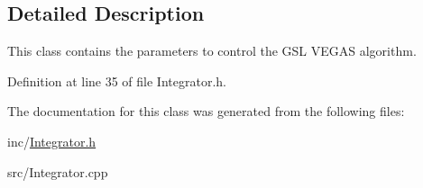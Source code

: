 \subsection{Detailed Description}
This class contains the parameters to control the G\+S\+L V\+E\+G\+A\+S algorithm. 

Definition at line 35 of file Integrator.\+h.



The documentation for this class was generated from the following files\+:\begin{DoxyCompactItemize}
\item 
inc/\hyperlink{Integrator_8h}{Integrator.\+h}\item 
src/Integrator.\+cpp\end{DoxyCompactItemize}
